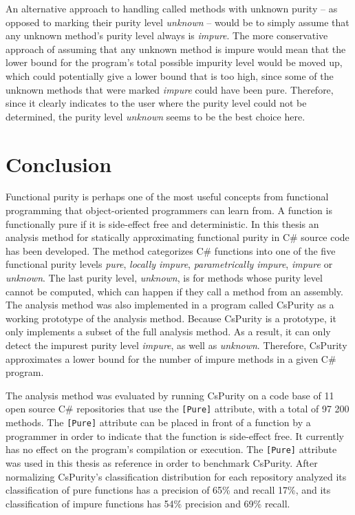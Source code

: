 \documentclass[a4paper,12pt]{article}
\begin{document}
An alternative approach to handling called methods with unknown purity -- as opposed to marking their purity level \textit{unknown} -- would be to simply assume that any unknown method's purity level always is \textit{impure}. The more conservative approach of assuming that any unknown method is impure would mean that the lower bound for the program's total possible impurity level would be moved up, which could potentially give a lower bound that is too high, since some of the unknown methods that were marked \textit{impure} could have been pure. Therefore, since it clearly indicates to the user where the purity level could not be determined, the purity level \textit{unknown} seems to be the best choice here.

\section{Conclusion} \label{sec:conclusion}


Functional purity is perhaps one of the most useful concepts from functional programming that object-oriented programmers can learn from. A function is functionally pure if it is side-effect free and deterministic. In this thesis an analysis method for statically approximating functional purity in C\# source code has been developed. The method categorizes C\# functions into one of the five functional purity levels \textit{pure}, \textit{locally impure}, \textit{parametrically impure}, \textit{impure} or \textit{unknown}. The last purity level, \textit{unknown}, is for methods whose purity level cannot be computed, which can happen if they call a method from an assembly. The analysis method was also implemented in a program called CsPurity as a working prototype of the analysis method. Because CsPurity is a prototype, it only implements a subset of the full analysis method. As a result, it can only detect the impurest purity level \textit{impure}, as well as \textit{unknown}. Therefore, CsPurity approximates a lower bound for the number of impure methods in a given C\# program.

The analysis method was evaluated by running CsPurity on a code base of 11 open source C\# repositories that use the \texttt{[Pure]} attribute, with a total of 97 200 methods. The \texttt{[Pure]} attribute can be placed in front of a function by a programmer in order to indicate that the function is side-effect free. It currently has no effect on the program's compilation or execution. The \texttt{[Pure]} attribute was used in this thesis as reference in order to benchmark CsPurity. After normalizing CsPurity's classification distribution for each repository analyzed its classification of pure functions has a precision of 65\% and recall 17\%, and its classification of impure functions has 54\% precision and 69\% recall.
\end{document}
